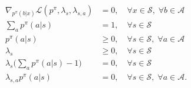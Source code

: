 \documentclass[a4paper, 10pt]{article}
\begin{document}
\begin{align}
  \nabla_{p^\pi(b|x)} \mathcal{L}(p^\pi, \lambda_s, \lambda_{s, a}) &= 0, \quad \forall x \in \mathcal{S}, \; \forall b \in \mathcal{A} \tag{C1} \label{eq: KKT1} \\
  \sum_a p^\pi(a | s) &= 1, \quad \forall s \in \mathcal{S} \tag{C2} \label{eq: KKT2} \\
  p^\pi(a | s) &\geq 0, \quad \forall s \in \mathcal{S}, \; \forall a \in \mathcal{A} \tag{C3} \label{eq: KKT3} \\
  \lambda_s &\geq 0, \quad \forall s \in \mathcal{S} \tag{C4} \label{eq: KKT4} \\
  \lambda_{s} \bigg( \sum_a p^\pi(a | s) - 1 \bigg) &= 0, \quad \forall s \in \mathcal{S} \tag{C5} \label{eq: KKT5} \\
  \lambda_{s, a} p^\pi(a | s) &= 0, \quad \forall s \in \mathcal{S}, \; \forall a \in \mathcal{A}. \tag{C6} \label{eq: KKT6}
\end{align}
\end{document}
